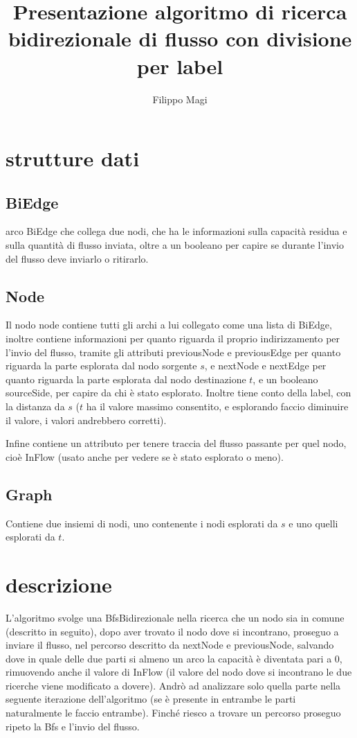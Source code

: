 \documentclass{article}
\title{Presentazione algoritmo di ricerca bidirezionale di flusso con divisione per label}
\author{Filippo Magi }
\begin{document}
\maketitle

\section{strutture dati}

\subsection{ BiEdge}

arco BiEdge che collega due nodi, che ha le informazioni sulla capacità residua e sulla quantità di flusso inviata, oltre a un booleano per capire se durante l'invio del flusso deve inviarlo o ritirarlo.

\subsection{Node}

Il nodo node contiene tutti gli archi a lui collegato come una lista di BiEdge, inoltre contiene informazioni per quanto riguarda il proprio indirizzamento per l'invio del flusso, tramite gli attributi previousNode e previousEdge per quanto riguarda la parte esplorata dal nodo sorgente $s$, e nextNode e nextEdge per quanto riguarda la parte esplorata dal nodo destinazione $t$, e un booleano sourceSide, per capire da chi è stato esplorato.
Inoltre tiene conto della label, con la distanza da $s$ ($t$ ha il valore massimo consentito, e esplorando faccio diminuire il valore, i valori andrebbero corretti).

Infine contiene un attributo per tenere traccia del flusso passante per quel nodo, cioè InFlow (usato anche per vedere se è stato esplorato o meno).

\subsection{Graph}

Contiene due insiemi di nodi, uno contenente i nodi esplorati da $s$ e uno quelli esplorati da $t$.

\section{descrizione}

L'algoritmo svolge una BfsBidirezionale nella ricerca che un nodo sia in comune (descritto in seguito),
dopo aver trovato il nodo dove si incontrano, proseguo a inviare il flusso, nel percorso descritto da nextNode e previousNode, salvando dove in quale delle due parti si almeno un arco la capacità è diventata pari a 0, rimuovendo anche il valore di InFlow (il valore del nodo dove si incontrano le due ricerche viene modificato a dovere).
Andrò ad analizzare solo quella parte nella seguente iterazione dell'algoritmo (se è presente in entrambe le parti naturalmente le faccio entrambe).
Finché riesco a trovare un percorso proseguo ripeto la Bfs e l'invio del flusso.
\end{document}
